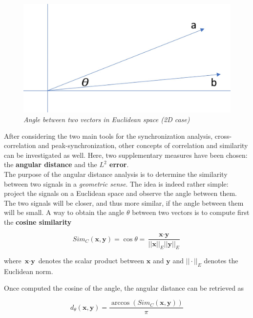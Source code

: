 \documentclass[a4paper]{article}
\begin{document}
\begin{figure}[H]
	\begin{center}
		\hspace*{-3.5cm}
		\includegraphics[scale=.20]{cos_sim.jpg} 
	\end{center} 
	\caption{\textit{Angle between two vectors in Euclidean space (2D case)}}
	
\end{figure}

After considering the two main tools for the synchronization analysis, cross-correlation and peak-synchronization, other concepts of correlation and similarity can be investigated as well. Here, two supplementary measures have been chosen: the \textbf{angular distance} and the \textbf{$L^2$ error}.
\\

The purpose of the angular distance analysis is to determine the similarity between two signals in a \textit{geometric sense}. The idea is indeed rather simple: project the signals on a Euclidean space and observe the angle between them. The two signals will be closer, and thus more similar, if the angle between them will be small.
A way to obtain the angle $\theta$ between two vectors is to compute first the \textbf{cosine similarity}

$$ Sim_C(\textbf{x},\textbf{y}) = \cos \theta =  \frac{\textbf{x} \cdot \textbf{y}}{||\textbf{x}||_E ||\textbf{y}||_E} $$

where $\textbf{x} \cdot \textbf{y}$ denotes the scalar product between $\textbf{x}$ and $\textbf{y}$ and $ ||\cdot||_E$ denotes the Euclidean norm.

Once computed the cosine of the angle, the angular distance can be retrieved as

$$ d_\theta (\textbf{x},\textbf{y}) = \frac{\arccos(Sim_C(\textbf{x},\textbf{y}))}{\pi} $$
\end{document}
